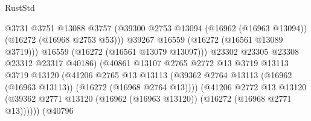 \begin{lexlean}{RustStd}
\begin{coremodule}
                                              @3731
                                              @3751
                                              @13088
                                              @3757
                                              (@39300
                                                @2753
                                                @13094
                                                (@16962 (@16963 @13094))
                                                (@16272 (@16968 @2753 @53)))
                                              @39267
                                              @16559
                                              (@16272 (@16561 @13089 @3719)))
                                            @16559
                                            (@16272 (@16561 @13079 @13097)))
                                          @23302
                                          @23305
                                          @23308
                                          @23312
                                          @23317
                                          @40186)
                                        (@40861
                                          @13107
                                          @2765
                                          @2772
                                          @13
                                          @3719
                                          @13113
                                          @3719
                                          @13120
                                          (@41206
                                            @2765
                                            @13
                                            @13113
                                            (@39362
                                              @2764
                                              @13113
                                              (@16962 (@16963 @13113))
                                              (@16272 (@16968 @2764 @13))))
                                          (@41206
                                            @2772
                                            @13
                                            @13120
                                            (@39362
                                              @2771
                                              @13120
                                              (@16962 (@16963 @13120))
                                              (@16272 (@16968 @2771 @13))))))
                                      (@40796

\end{coremodule}
\end{lexlean}
